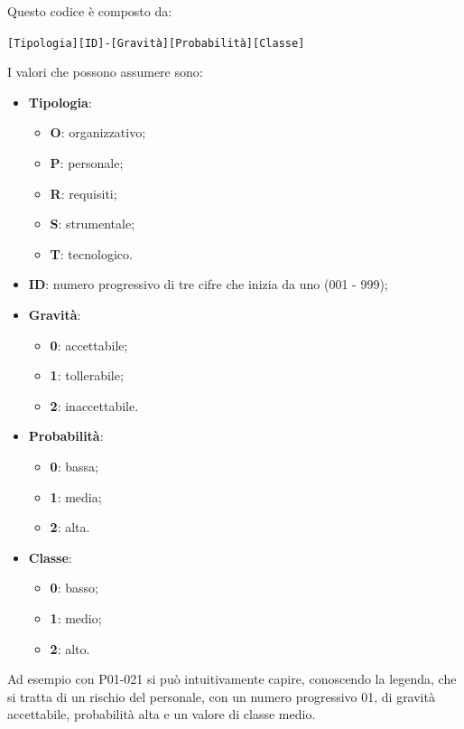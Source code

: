 	Questo codice è composto da:
	
	\begin{center}
		\texttt{[Tipologia][ID]-[Gravità][Probabilità][Classe]}
	\end{center}

	I valori che possono assumere sono:
	
	\begin{itemize}
		\item \textbf{Tipologia}:
			\begin{itemize}
				\item \textbf{O}: organizzativo;
				\item \textbf{P}: personale;
				\item \textbf{R}: requisiti;
				\item \textbf{S}: strumentale;
				\item \textbf{T}: tecnologico.
			\end{itemize}
		
		\item \textbf{ID}: numero progressivo di tre cifre che inizia da uno (001 - 999);
		\item \textbf{Gravità}:
			\begin{itemize}
				\item \textbf{0}: accettabile;
				\item \textbf{1}: tollerabile;
				\item \textbf{2}: inaccettabile.
			\end{itemize}
		
		\item \textbf{Probabilità}:
			\begin{itemize}
				\item \textbf{0}: bassa;
				\item \textbf{1}: media;
				\item \textbf{2}: alta.
			\end{itemize}
		
		\item \textbf{Classe}:
			\begin{itemize}
				\item \textbf{0}: basso;
				\item \textbf{1}: medio;
				\item \textbf{2}: alto.
			\end{itemize}
	\end{itemize}

	Ad esempio con P01-021 si può intuitivamente capire, conoscendo la legenda, che si tratta di un rischio del personale, con un numero progressivo 01, di gravità accettabile, probabilità alta e un valore di classe medio.
	

